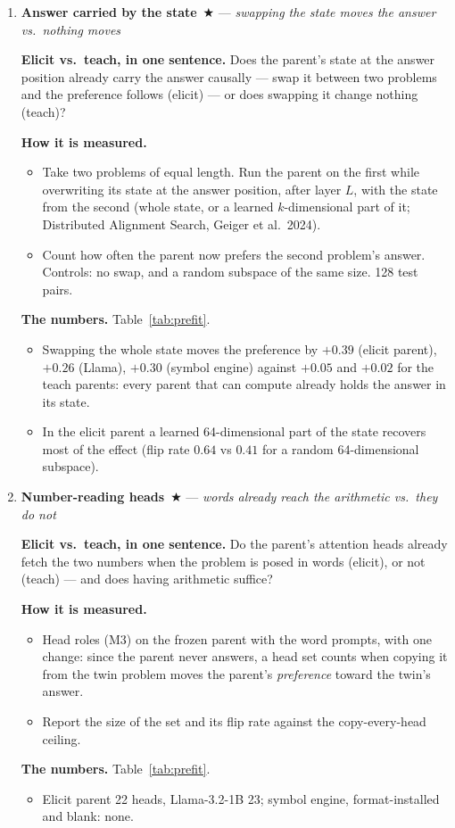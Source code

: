 \documentclass[11pt]{article}
\newcommand{\what}[1]{\par\noindent\textbf{Elicit vs.\ teach, in one sentence.} #1}
\newcommand{\how}[1]{\par\noindent\textbf{How it is measured.} #1}
\newcommand{\numbers}[1]{\par\noindent\textbf{The numbers.} #1\par\medskip}
\newenvironment{steps}{\begin{itemize}[nosep,leftmargin=1.2em,topsep=2pt]}{\end{itemize}}
\newcommand{\metricsecp}[2]{\item \textbf{#1}~$\bigstar$ --- \emph{#2}}
\begin{document}
\begin{enumerate}[label=\textbf{M\arabic*}, leftmargin=*, itemsep=1.2em, resume]
{\begin{steps}
the loss falls faster and faster; for a teach parent every descent tapers off.
\end{steps}}
\metricsecp{Answer carried by the state}{swapping the state moves the answer vs.\ nothing moves}
\what{Does the parent's state at the answer position already carry the answer causally --- swap
it between two problems and the preference follows (elicit) --- or does swapping it change
nothing (teach)?}
\how{
\begin{steps}
\item Take two problems of equal length. Run the parent on the first while overwriting its
state at the answer position, after layer $L$, with the state from the second (whole state, or a
learned $k$-dimensional part of it; Distributed Alignment Search, Geiger et al.\ 2024).
\item Count how often the parent now prefers the second problem's answer. Controls: no swap, and
a random subspace of the same size. 128 test pairs.
\end{steps}}
\numbers{Table~\ref{tab:prefit}.
\begin{steps}
\item Swapping the whole state moves the preference by $+0.39$ (elicit parent), $+0.26$ (Llama),
$+0.30$ (symbol engine) against $+0.05$ and $+0.02$ for the teach parents: every parent that can
compute already holds the answer in its state.
\item In the elicit parent a learned 64-dimensional part of the state recovers most of the effect
(flip rate $0.64$ vs $0.41$ for a random 64-dimensional subspace).
\end{steps}}
\metricsecp{Number-reading heads}{words already reach the arithmetic vs.\ they do not}
\what{Do the parent's attention heads already fetch the two numbers when the problem is posed in
words (elicit), or not (teach) --- and does having arithmetic suffice?}
\how{
\begin{steps}
\item Head roles (M3) on the frozen parent with the word prompts, with one change: since the
parent never answers, a head set counts when copying it from the twin problem moves the parent's
\emph{preference} toward the twin's answer.
\item Report the size of the set and its flip rate against the copy-every-head ceiling.
\end{steps}}
\numbers{Table~\ref{tab:prefit}.
\begin{steps}
\item Elicit parent 22 heads, Llama-3.2-1B 23; symbol engine, format-installed and blank: none.

\end{steps}}
\end{enumerate}
\end{document}
